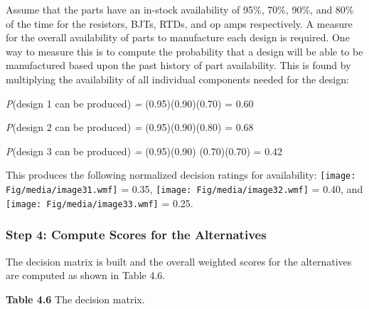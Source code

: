 Assume that the parts have an in-stock availability of 95\%, 70\%, 90\%,
and 80\% of the time for the resistors, BJTs, RTDs, and op amps
respectively. A measure for the overall availability of parts to
manufacture each design is re­quired. One way to measure this is to
compute the probability that a design will be able to be manufactured
based upon the past history of part availability. This is found by
multiplying the availability of all individual components needed for the
design:

\emph{P}(design 1 can be produced) \emph{=} (0.95)(0.90)(0.70) = 0.60

\emph{P}(design 2 can be produced) \emph{=} (0.95)(0.90)(0.80) = 0.68

\emph{P}(design 3 can be produced) \emph{=} (0.95)(0.90) (0.70)(0.70) =
0.42

This produces the following normalized decision ratings for
availability: \texttt{[image: Fig/media/image31.wmf]} = 0.35,
\texttt{[image: Fig/media/image32.wmf]} = 0.40, and
\texttt{[image: Fig/media/image33.wmf]} = 0.25.

\subsubsection*{Step 4: Compute Scores for the
Alternatives}\label{step-4-compute-scores-for-the-alternatives}

The decision matrix is built and the overall weighted scores for the
alternatives are computed as shown in Table 4.6.

\textbf{Table 4.6} The decision matrix.

